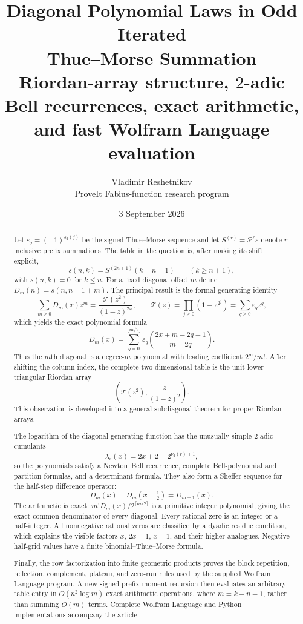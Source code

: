 \documentclass[11pt,oneside]{article}
\title{\bfseries Diagonal Polynomial Laws in Odd Iterated\\
Thue--Morse Summation\\[0.35em]
\large Riordan-array structure, $2$-adic Bell recurrences, exact arithmetic,\\
and fast Wolfram Language evaluation}
\author{Vladimir Reshetnikov\\
\small ProveIt Fabius-function research program}
\date{3 September 2026}
\theoremstyle{definition}
\theoremstyle{remark}
\newcommand{\eps}{\varepsilon}
\newcommand{\Diag}{D}
\newcommand{\Prefix}{\mathcal P}
\newcommand{\TM}{\mathcal T}
\newcommand{\vtwo}{\nu_{2}}
\newcommand{\bitsum}{s_{2}}
\begin{document}
\maketitle

\begin{abstract}
Let $\eps_j=(-1)^{\bitsum(j)}$ be the signed Thue--Morse sequence and let
$S^{(r)}=\Prefix^r\eps$ denote $r$ inclusive prefix summations.  The table in
the question is, after making its shift explicit,
\[
 s(n,k)=S^{(2n+1)}(k-n-1)\qquad (k\ge n+1),
\]
with $s(n,k)=0$ for $k\le n$.  For a fixed diagonal offset $m$ define
$\Diag_m(n)=s(n,n+1+m)$.  The principal result is the formal generating
identity
\[
 \sum_{m\ge0}\Diag_m(x)z^m
   =\frac{\TM(z^2)}{(1-z)^{2x}},
 \qquad
 \TM(z)=\prod_{j\ge0}(1-z^{2^j})
       =\sum_{q\ge0}\eps_qz^q,
\]
which yields the exact polynomial formula
\[
 \Diag_m(x)=\sum_{q=0}^{\lfloor m/2\rfloor}
   \eps_q\binom{2x+m-2q-1}{m-2q}.
\]
Thus the $m$th diagonal is a degree-$m$ polynomial with leading coefficient
$2^m/m!$.  After shifting the column index, the complete two-dimensional
table is the unit lower-triangular Riordan array
\[
 \left(\TM(z^2),\frac{z}{(1-z)^2}\right).
\]
This observation is developed into a general subdiagonal theorem for proper
Riordan arrays.

The logarithm of the diagonal generating function has the unusually simple
$2$-adic cumulants
\[
 \lambda_r(x)=2x+2-2^{\vtwo(r)+1},
\]
so the polynomials satisfy a Newton--Bell recurrence, complete Bell-polynomial
and partition formulas, and a determinant formula.  They also form a Sheffer
sequence for the half-step difference operator:
\[
 \Diag_m(x)-\Diag_m\!\left(x-\tfrac12\right)=\Diag_{m-1}(x).
\]
The arithmetic is exact: $m!\Diag_m(x)/2^{\lceil m/2\rceil}$ is a primitive
integer polynomial, giving the exact common denominator of every diagonal.
Every rational zero is an integer or a half-integer.  All nonnegative rational
zeros are classified by a dyadic residue condition, which explains the
visible factors $x$, $2x-1$, $x-1$, and their higher analogues.  Negative
half-grid values have a finite binomial--Thue--Morse formula.

Finally, the row factorization into finite geometric products proves the
block repetition, reflection, complement, plateau, and zero-run rules used by
the supplied Wolfram Language program.  A new signed-prefix-moment recursion
then evaluates an arbitrary table entry in $O(n^2\log m)$ exact arithmetic
operations, where $m=k-n-1$, rather than summing $O(m)$ terms.  Complete
Wolfram Language and Python implementations accompany the article.
\end{abstract}
\end{document}
